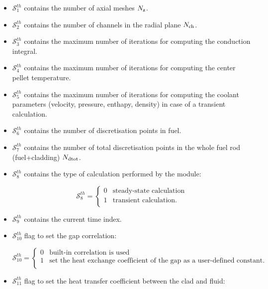 \begin{itemize}
\item $\mathcal{S}^{th}_{1}$ contains the number of axial meshes $N_{\rm z}$.
\item $\mathcal{S}^{th}_{2}$ contains the number of channels in the radial plane $N_{\rm ch}$.
\item $\mathcal{S}^{th}_{3}$ contains the maximum number of iterations for computing the
conduction integral.
\item $\mathcal{S}^{th}_{4}$ contains the maximum number of iterations for computing the
center pellet temperature.
\item $\mathcal{S}^{th}_{5}$ contains the maximum number of iterations for computing the
coolant parameters (velocity, pressure, enthapy, density) in case of a transient calculation.
\item $\mathcal{S}^{th}_{6}$ contains the number of discretisation points in fuel.
\item $\mathcal{S}^{th}_{7}$ contains the number of total discretisation points in the whole fuel rod (fuel+cladding) $N_{\rm dtot}$.
\item $\mathcal{S}^{th}_{8}$ contains the type of calculation performed by the  module:

\begin{displaymath} \mathcal{S}^{th}_{8} = \left\{
\begin{array}{rl}
 0 & \textrm{steady-state calculation} \\
 1 & \textrm{transient calculation.} \\
\end{array} \right.
\end{displaymath}

\item $\mathcal{S}^{th}_{9}$ contains the current time index.
\item $\mathcal{S}^{th}_{10}$ flag to set the gap correlation:

\begin{displaymath} \mathcal{S}^{th}_{10} = \left\{
\begin{array}{rl}
 0 & \textrm{built-in correlation is used} \\
 1 & \textrm{set the heat exchange coefficient of the gap as a user-defined constant.} \\
\end{array} \right.
\end{displaymath}

\item $\mathcal{S}^{th}_{11}$ flag to set the heat transfer coefficient between the clad and fluid:


\end{itemize}
